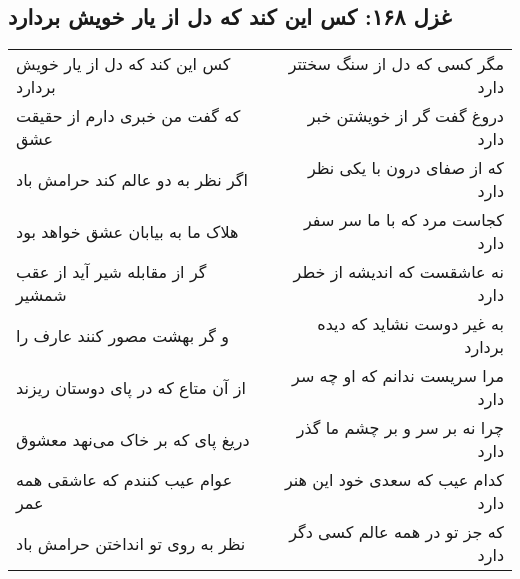 \begin{center}
\section*{غزل ۱۶۸: کس این کند که دل از یار خویش بردارد}
\label{sec:168}
\begin{longtable}{l p{0.5cm} r}
کس این کند که دل از یار خویش بردارد
&&
مگر کسی که دل از سنگ سختتر دارد
\\
که گفت من خبری دارم از حقیقت عشق
&&
دروغ گفت گر از خویشتن خبر دارد
\\
اگر نظر به دو عالم کند حرامش باد
&&
که از صفای درون با یکی نظر دارد
\\
هلاک ما به بیابان عشق خواهد بود
&&
کجاست مرد که با ما سر سفر دارد
\\
گر از مقابله شیر آید از عقب شمشیر
&&
نه عاشقست که اندیشه از خطر دارد
\\
و گر بهشت مصور کنند عارف را
&&
به غیر دوست نشاید که دیده بردارد
\\
از آن متاع که در پای دوستان ریزند
&&
مرا سریست ندانم که او چه سر دارد
\\
دریغ پای که بر خاک می‌نهد معشوق
&&
چرا نه بر سر و بر چشم ما گذر دارد
\\
عوام عیب کنندم که عاشقی همه عمر
&&
کدام عیب که سعدی خود این هنر دارد
\\
نظر به روی تو انداختن حرامش باد
&&
که جز تو در همه عالم کسی دگر دارد
\\
\end{longtable}
\end{center}
